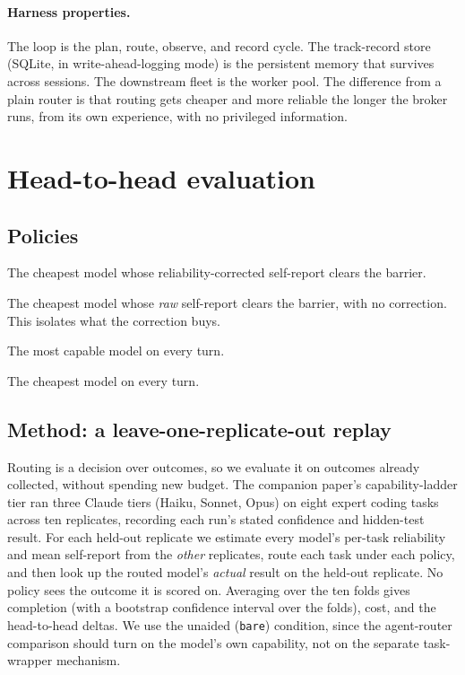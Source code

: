 \documentclass[11pt]{article}
\newcommand{\code}[1]{\texttt{#1}}
\begin{document}
\paragraph{Harness properties.} The loop is the plan, route, observe, and record cycle. The track-record store (SQLite, in write-ahead-logging mode) is the persistent memory that survives across sessions. The downstream fleet is the worker pool. The difference from a plain router is that routing gets cheaper and more reliable the longer the broker runs, from its own experience, with no privileged information.

\section{Head-to-head evaluation}

\subsection{Policies}
\begin{description}\itemsep2pt
\item[CTA (corrected).] The cheapest model whose reliability-corrected self-report clears the barrier.
\item[Naive self-report.] The cheapest model whose \emph{raw} self-report clears the barrier, with no correction. This isolates what the correction buys.
\item[Always frontier.] The most capable model on every turn.
\item[Single cheapest.] The cheapest model on every turn.
\end{description}

\subsection{Method: a leave-one-replicate-out replay}
Routing is a decision over outcomes, so we evaluate it on outcomes already collected, without spending new budget. The companion paper's capability-ladder tier ran three Claude tiers (Haiku, Sonnet, Opus) on eight expert coding tasks across ten replicates, recording each run's stated confidence and hidden-test result. For each held-out replicate we estimate every model's per-task reliability and mean self-report from the \emph{other} replicates, route each task under each policy, and then look up the routed model's \emph{actual} result on the held-out replicate. No policy sees the outcome it is scored on. Averaging over the ten folds gives completion (with a bootstrap confidence interval over the folds), cost, and the head-to-head deltas. We use the unaided (\code{bare}) condition, since the agent-router comparison should turn on the model's own capability, not on the separate task-wrapper mechanism.
\end{document}
